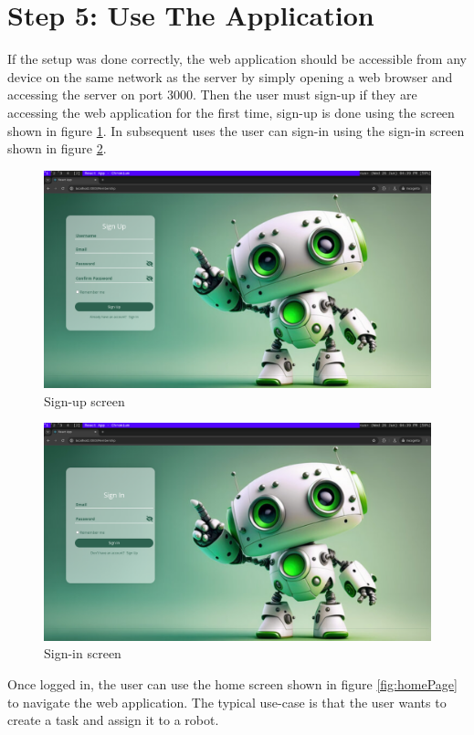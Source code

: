 \section{Step 5: Use The Application}
If the setup was done correctly, the web application should be accessible from any device on the same network as the server by simply opening a web browser and accessing the server on port 3000. Then the user must sign-up if they are accessing the web application for the first time, sign-up is done using the screen shown in figure \ref{fig:sign-up}. In subsequent uses the user can sign-in using the sign-in screen shown in figure \ref{fig:sign-in}.
\begin{figure}[h!]
	\centering
	\includegraphics[scale=0.2]{./Figures/WebApp/sign-up.png}
	\caption{Sign-up screen}
	\label{fig:sign-up}
\end{figure}
\begin{figure}[h!]
	\centering
	\includegraphics[scale=0.2]{./Figures/WebApp/sign-in.png}
	\caption{Sign-in screen}
	\label{fig:sign-in}
\end{figure}

Once logged in, the user can use the home screen shown in figure \ref{fig:homePage} to navigate the web application. The typical use-case is that the user wants to create a task and assign it to a robot.

